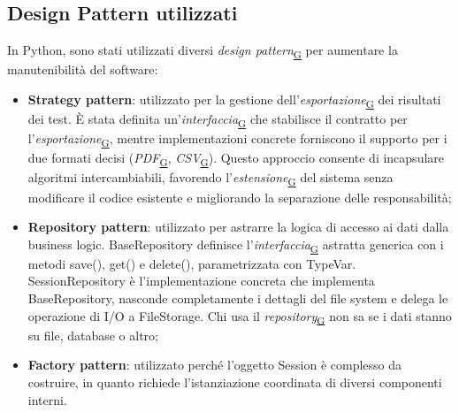 \documentclass[a4paper,12pt]{article}
\begin{document}
        \subsection{Design Pattern utilizzati}
            In Python, sono stati utilizzati diversi \textit{design pattern}\textsubscript{\href{https://atlasteam9.github.io/Atlas/glossario.html\#DesignPattern}{G}} per aumentare la manutenibilità del software:
            \begin{itemize}
                \item \textbf{Strategy pattern}: utilizzato per la gestione dell'\textit{esportazione}\textsubscript{\href{https://atlasteam9.github.io/Atlas/glossario.html\#Esportazione}{G}} dei risultati dei test. È stata definita un'\textit{interfaccia}\textsubscript{\href{https://atlasteam9.github.io/Atlas/glossario.html\#Interfaccia}{G}} che stabilisce il contratto per 
                    l'\textit{esportazione}\textsubscript{\href{https://atlasteam9.github.io/Atlas/glossario.html\#Esportazione}{G}}, mentre implementazioni concrete forniscono il supporto per i due formati decisi (\textit{PDF}\textsubscript{\href{https://atlasteam9.github.io/Atlas/glossario.html\#PDF}{G}}, \textit{CSV}\textsubscript{\href{https://atlasteam9.github.io/Atlas/glossario.html\#CSV}{G}}). Questo approccio consente di incapsulare algoritmi intercambiabili, 
                    favorendo l'\textit{estensione}\textsubscript{\href{https://atlasteam9.github.io/Atlas/glossario.html\#Estensione}{G}} del sistema senza modificare il codice esistente e migliorando la separazione delle responsabilità;
                \item \textbf{Repository pattern}: utilizzato per astrarre la logica di accesso ai dati dalla business logic. BaseRepository definisce l'\textit{interfaccia}\textsubscript{\href{https://atlasteam9.github.io/Atlas/glossario.html\#Interfaccia}{G}} astratta generica con i metodi 
                    {\ttfamily save(), get()} e {\ttfamily delete()}, parametrizzata con TypeVar. SessionRepository è l'implementazione concreta che implementa BaseRepository, nasconde completamente i 
                    dettagli del file system e delega le operazione di I/O a FileStorage. Chi usa il \textit{repository}\textsubscript{\href{https://atlasteam9.github.io/Atlas/glossario.html\#Repository}{G}} non sa se i dati stanno su file, database o altro;
                \item \textbf{Factory pattern}: utilizzato perché l'oggetto Session è complesso da costruire, in quanto richiede l'istanziazione coordinata di diversi componenti interni.

\end{itemize}
\end{document}
